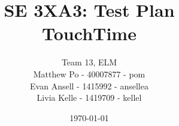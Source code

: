 % 


% 

\documentclass[12pt, titlepage]{article}

\usepackage{booktabs}
\usepackage{tabularx}
\usepackage{hyperref}
\usepackage{float}
\hypersetup{
    colorlinks,
    citecolor=black,
    filecolor=black,
    linkcolor=red,
    urlcolor=blue
}
\usepackage[round]{natbib}

\title{SE 3XA3: Test Plan\\TouchTime}

\author{Team 13, ELM
		\\ Matthew Po - 40007877 - pom
		\\ Evan Ansell - 1415992 - ansellea
		\\ Livia Kelle - 1419709 - kellel
}

\date{\today}

%



\maketitle

\tableofcontents
\listoftables


